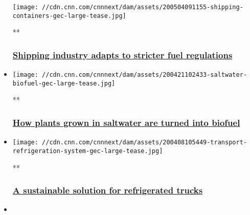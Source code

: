 \begin{itemize}
  \texttt{[image: //cdn.cnn.com/cnnnext/dam/assets/200504091155-shipping-containers-gec-large-tease.jpg]}

  **

  \hypertarget{shipping-industry-adapts-to-stricter-fuel-regulations-}{%
  \subsubsection{\texorpdfstring{\href{/videos/business/2020/05/04/shipping-fuel-standards-environment-gec.cnn-business}{Shipping
  industry adapts to stricter fuel regulations
  }}{Shipping industry adapts to stricter fuel regulations }}\label{shipping-industry-adapts-to-stricter-fuel-regulations-}}
\item
  \href{/videos/business/2020/04/21/saltwater-biofuel-aviation-gec.cnn-business}{}

  \texttt{[image: //cdn.cnn.com/cnnnext/dam/assets/200421102433-saltwater-biofuel-gec-large-tease.jpg]}

  **

  \hypertarget{how-plants-grown-in-saltwater-are-turned-into-biofuel}{%
  \subsubsection{\texorpdfstring{\href{/videos/business/2020/04/21/saltwater-biofuel-aviation-gec.cnn-business}{How
  plants grown in saltwater are turned into
  biofuel}}{How plants grown in saltwater are turned into biofuel}}\label{how-plants-grown-in-saltwater-are-turned-into-biofuel}}
\item
  \href{/videos/business/2020/04/08/nitrogen-cooling-system-transport-gec.cnn-business}{}

  \texttt{[image: //cdn.cnn.com/cnnnext/dam/assets/200408105449-transport-refrigeration-system-gec-large-tease.jpg]}

  **

  \hypertarget{a-sustainable-solution-for-refrigerated-trucks}{%
  \subsubsection{\texorpdfstring{\href{/videos/business/2020/04/08/nitrogen-cooling-system-transport-gec.cnn-business}{A
  sustainable solution for refrigerated
  trucks}}{A sustainable solution for refrigerated trucks}}\label{a-sustainable-solution-for-refrigerated-trucks}}
\item
  \href{/videos/business/2020/04/21/carbon-capture-explainer-gec.cnn-business}{}


\end{itemize}
